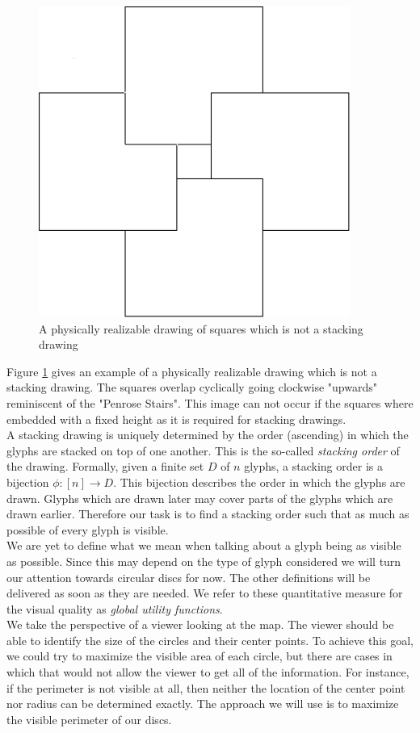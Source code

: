 \documentclass[a4paper,11pt]{article}
\begin{document}
%
\begin{figure}[H]
  \centering
  \includegraphics[width=0.4\linewidth]{phys_real_squares.png}
  \caption{A physically realizable drawing of squares which is not a stacking drawing}
  \label{fig:physicalSquares}
\end{figure}
%

Figure \ref{fig:physicalSquares} gives an example of a physically realizable drawing which is not a stacking drawing. The squares overlap cyclically going clockwise "upwards" reminiscent of the "Penrose Stairs". This image can not occur if the squares where embedded with a fixed height as it is required for stacking drawings.\\

A stacking drawing is uniquely determined by the order (ascending) in which the glyphs are stacked on top of one another. This is the so-called \textit{stacking order} of the drawing. Formally, given a finite set $D$ of $n$ glyphs, a stacking order is a bijection $\phi: [n]\rightarrow D$. This bijection describes the order in which the glyphs are drawn. Glyphs which are drawn later may cover parts of the glyphs which are drawn earlier. Therefore our task is to find a stacking order such that as much as possible of every glyph is visible.\\

We are yet to define what we mean when talking about a glyph being as visible as possible. Since this may depend on the type of glyph considered we will turn our attention towards circular discs for now. The other definitions will be delivered as soon as they are needed. We refer to these quantitative measure for the visual quality as \textit{global utility functions}.\\

We take the perspective of a viewer looking at the map. The viewer should be able to identify the size of the circles and their center points. To achieve this goal, we could try to maximize the visible area of each circle, but there are cases in which that would not allow the viewer to get all of the information. For instance, if the perimeter is not visible at all, then neither the location of the center point nor radius can be determined exactly. The approach we will use is to maximize the visible perimeter of our discs.\\
\end{document}
